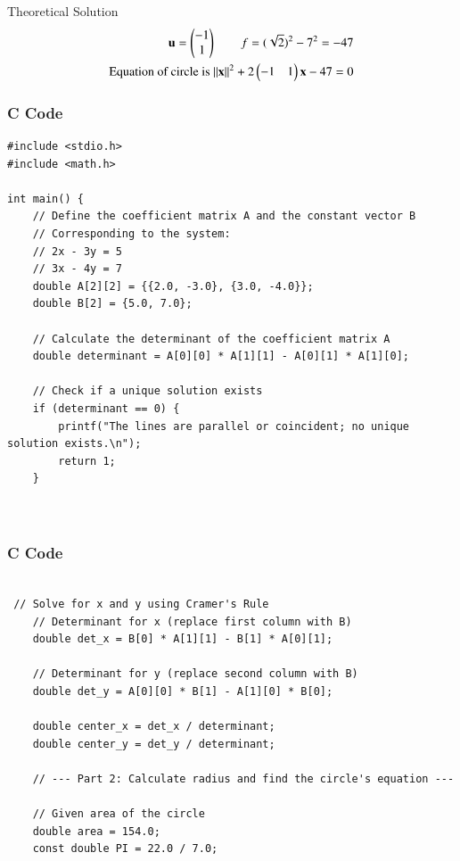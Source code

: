 \documentclass{beamer}
\begin{document}
\begin{frame}{Theoretical Solution}
\begin{align}
    \mathbf{u}=\begin{pmatrix}-1\\1\end{pmatrix} \qquad f=(\sqrt{2})^2 - 7^2 = -47\\
     \text{Equation of circle is }||\mathbf{x}||^2 + 2\begin{pmatrix}-1&1\end{pmatrix}\mathbf{x} -47 = 0
\end{align}
\end{frame}

\begin{frame}[fragile]
    \frametitle{C Code }
    \begin{lstlisting}
#include <stdio.h>
#include <math.h>

int main() {
    // Define the coefficient matrix A and the constant vector B
    // Corresponding to the system:
    // 2x - 3y = 5
    // 3x - 4y = 7
    double A[2][2] = {{2.0, -3.0}, {3.0, -4.0}};
    double B[2] = {5.0, 7.0};

    // Calculate the determinant of the coefficient matrix A
    double determinant = A[0][0] * A[1][1] - A[0][1] * A[1][0];

    // Check if a unique solution exists
    if (determinant == 0) {
        printf("The lines are parallel or coincident; no unique solution exists.\n");
        return 1;
    }

   

      \end{lstlisting}
\end{frame} 

\begin{frame}[fragile]
    \frametitle{C Code }
    \begin{lstlisting}

 // Solve for x and y using Cramer's Rule
    // Determinant for x (replace first column with B)
    double det_x = B[0] * A[1][1] - B[1] * A[0][1];

    // Determinant for y (replace second column with B)
    double det_y = A[0][0] * B[1] - A[1][0] * B[0];

    double center_x = det_x / determinant;
    double center_y = det_y / determinant;

    // --- Part 2: Calculate radius and find the circle's equation ---

    // Given area of the circle
    double area = 154.0;
    const double PI = 22.0 / 7.0;

   
      \end{lstlisting}
\end{frame} 
\end{document}
